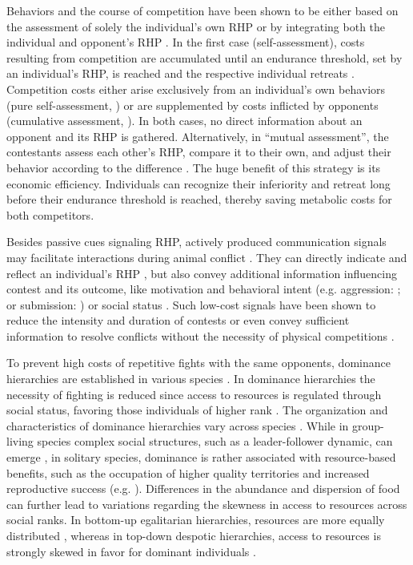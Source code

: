 Behaviors and the course of competition have been shown to be either based on the assessment of solely the individual’s own RHP or by integrating both the individual and opponent’s RHP \citep{Taylor2001, Enquist1990, Huyghe2005}. In the first case (self-assessment), costs resulting from competition are accumulated until an endurance threshold, set by an individual’s RHP, is reached and the respective individual retreats \citep{ArnottElwood2009}. Competition costs either arise exclusively from an individual’s own behaviors (pure self-assessment, \citealp{Taylor2003}) or are supplemented by costs inflicted by opponents (cumulative assessment, \citealp{Payne1998}). In both cases, no direct information about an opponent and its RHP is gathered. Alternatively, in ``mutual assessment'', the contestants assess each other’s RHP, compare it to their own, and adjust their behavior according to the difference \citep{EnquistLeimar1987}. The huge benefit of this strategy is its economic efficiency. Individuals can recognize their inferiority and retreat long before their endurance threshold is reached, thereby saving metabolic costs for both competitors.

Besides passive cues signaling RHP, actively produced communication signals may facilitate interactions during animal conflict \citep{ArnottElwood2009, Seyfarth2010}. They can directly indicate and reflect an individual’s RHP \citep{Davies1978, Cluttonbrock1979}, but also convey additional information influencing contest and its outcome, like motivation and behavioral intent (e.g. aggression: \citealp{Kareklas2019, Westby1970}; or submission: \citealp{Hupe2008, Silva2012}) or social status \citep{Fernald2014}. Such low-cost signals have been shown to reduce the intensity and duration of contests or even convey sufficient information to resolve conflicts without the necessity of physical competitions \citep{Parker1974, Cluttonbrock1979, Jason1990}.

To prevent high costs of repetitive fights with the same opponents, dominance hierarchies are established in various species \citep{Creel1996, Janson1985, Cluttonbrock1979}. In dominance hierarchies the necessity of fighting is reduced since access to resources is regulated through social status, favoring those individuals of higher rank \citep{Wauters1992, Taves2009}. The organization and characteristics of dominance hierarchies vary across species \citep{Janson1985, Cigliano1993, Sapolsky2005}. While in group-living species complex social structures, such as a leader-follower dynamic, can emerge \citep{Strandburg2018}, in solitary species, dominance is rather associated with resource-based benefits, such as the occupation of higher quality territories and increased reproductive success (e.g. \citealp{Cigliano1993}). Differences in the abundance and dispersion of food can further lead to variations regarding the skewness in access to resources across social ranks. In bottom-up egalitarian hierarchies, resources are more equally distributed \citep{Sapolsky2005}, whereas in top-down despotic hierarchies, access to resources is strongly skewed in favor for dominant individuals \citep{Kappeler2008}.


